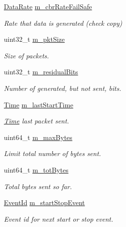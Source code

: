 \begin{DoxyCompactItemize}
\hyperlink{classns3_1_1DataRate}{Data\+Rate} \hyperlink{classns3_1_1OnOffApplication_a71655d4955026c0c9d9a39a9e92953d6}{m\+\_\+cbr\+Rate\+Fail\+Safe}
\begin{DoxyCompactList}\small\item\em Rate that data is generated (check copy) \end{DoxyCompactList}\item 
uint32\+\_\+t \hyperlink{classns3_1_1OnOffApplication_a245613852fed52486699a56f0a4984e6}{m\+\_\+pkt\+Size}
\begin{DoxyCompactList}\small\item\em Size of packets. \end{DoxyCompactList}\item 
uint32\+\_\+t \hyperlink{classns3_1_1OnOffApplication_a0c9bb1d89244488cd37b4a77ce4bcb45}{m\+\_\+residual\+Bits}
\begin{DoxyCompactList}\small\item\em Number of generated, but not sent, bits. \end{DoxyCompactList}\item 
\hyperlink{classns3_1_1Time}{Time} \hyperlink{classns3_1_1OnOffApplication_aa61765b68f90bebda8867638e25eb9ff}{m\+\_\+last\+Start\+Time}
\begin{DoxyCompactList}\small\item\em \hyperlink{classns3_1_1Time}{Time} last packet sent. \end{DoxyCompactList}\item 
uint64\+\_\+t \hyperlink{classns3_1_1OnOffApplication_a91d36bea04deb7139344300a2a9f9482}{m\+\_\+max\+Bytes}
\begin{DoxyCompactList}\small\item\em Limit total number of bytes sent. \end{DoxyCompactList}\item 
uint64\+\_\+t \hyperlink{classns3_1_1OnOffApplication_ab43f8091f6fac16d5aed373e7e35c739}{m\+\_\+tot\+Bytes}
\begin{DoxyCompactList}\small\item\em Total bytes sent so far. \end{DoxyCompactList}\item 
\hyperlink{classns3_1_1EventId}{Event\+Id} \hyperlink{classns3_1_1OnOffApplication_a5edd515322823a3813fff952bb32f8d0}{m\+\_\+start\+Stop\+Event}
\begin{DoxyCompactList}\small\item\em Event id for next start or stop event. \end{DoxyCompactList}\item 

\end{DoxyCompactItemize}
